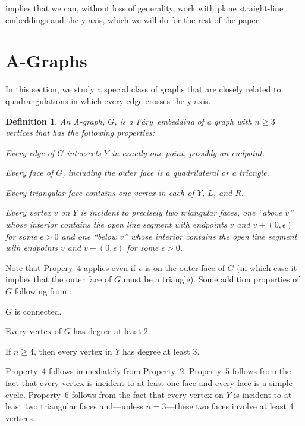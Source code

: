 \documentclass{patmorin}
\newtheorem{definition}{Definition}
\newcommand{\Fary}{Fáry}
\begin{document}
 implies that we can, without loss of
generality, work with plane straight-line embeddings and the
y-axis, which we will do for the rest of the paper. 

\section{A-Graphs}

In this section, we study a special class of graphs that are closely
related to quadrangulations in which every edge crosses the y-axis.

\begin{definition}
  An \emph{A-graph}, $G$, is a \Fary\ embedding of a graph with $n\ge 3$ vertices that has the following properties:
  \begin{compactenum}
   \item Every edge of $G$ intersects $Y$ in exactly one point, possibly an endpoint.
   \item Every face of $G$, including the outer face is a quadrilateral or a triangle.
   \item Every triangular face contains one vertex in each of $Y$, $L$,
   and $R$.  
   \item Every vertex $v$ on $Y$ is incident to precisely
   two triangular faces, one ``above $v$'' whose interior contains the open line segment with endpoints $v$ and $v+(0,\epsilon)$ for some $\epsilon>0$ and one ``below $v$'' whose interior contains the open line segment with endpoints $v$ and $v-(0,\epsilon)$ for some $\epsilon >0$.
  \end{compactenum}
\end{definition}
Note that Propery~4 applies even if $v$ is on the outer face of $G$ (in which case it implies that the outer face of $G$ must be a triangle).
Some addition properties of $G$ following from :
\begin{compactenum}\setcounter{enumi}{4}
  \item $G$ is connected.
  \item Every vertex of $G$ has degree at least 2.   
  \item If $n\ge 4$, then every vertex in $Y$ has degree at least 3. 
\end{compactenum}
Property~4 follows immediately from Property~2.
Property~5 follows from the fact that every vertex is incident to at
least one face and every face is a simple cycle.
Property~6 follows from the fact that every vertex on $Y$ is incident
to at least two triangular faces and---unless $n=3$---these two faces
involve at least 4 vertices.
\end{document}
